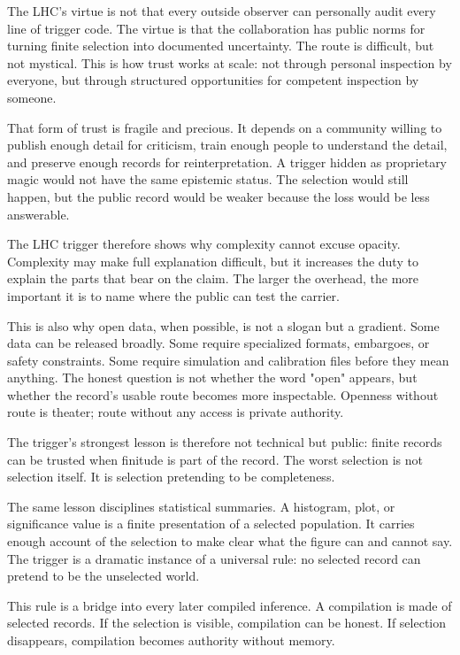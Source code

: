 The LHC's virtue is not that every outside observer can personally audit
every line of trigger code. The virtue is that the collaboration has
public norms for turning finite selection into documented uncertainty. The route is difficult,
but not mystical. This is how trust works at scale: not through personal
inspection by everyone, but through structured opportunities for competent
inspection by someone.

That form of trust is fragile and precious. It depends on a community willing
to publish enough detail for criticism, train enough people to understand the
detail, and preserve enough records for reinterpretation. A trigger hidden as
proprietary magic would not have the same epistemic status. The selection
would still happen, but the public record would be weaker because the loss
would be less answerable.

The LHC trigger therefore shows why complexity cannot excuse opacity.
Complexity may make full explanation difficult, but it increases the
duty to explain the parts that bear on the claim. The larger the
overhead, the more important it is to name where the public can test
the carrier.

This is also why open data, when possible, is not a slogan but a gradient.
Some data can be released broadly. Some require specialized formats, embargoes,
or safety constraints. Some require simulation and calibration files before
they mean anything. The honest question is not whether the word "open" appears,
but whether the record's usable route becomes more inspectable. Openness
without route is theater; route without any access is private authority.

The trigger's strongest lesson is therefore not technical but public: finite
records can be trusted when finitude is part of the record. The worst
selection is not selection itself. It is selection pretending to be
completeness.

The same lesson disciplines statistical summaries. A histogram, plot, or
significance value is a finite presentation of a selected population.
It carries enough account of the selection to make clear what the
figure can and cannot say. The trigger is a dramatic instance of a
universal rule: no selected record can pretend to be the unselected
world.

This rule is a bridge into every later compiled inference. A compilation is
made of selected records. If the selection is visible, compilation can be
honest. If selection disappears, compilation becomes authority without memory.

